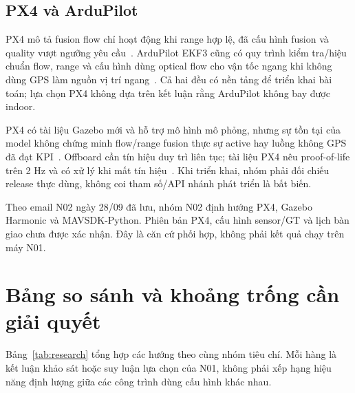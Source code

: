 \documentclass[a4paper,12pt]{article}
\begin{document}
\subsection{PX4 và ArduPilot}
PX4 mô tả fusion flow chỉ hoạt động khi range hợp lệ, đã cấu hình fusion và quality vượt ngưỡng yêu cầu~\cite{source3}. ArduPilot EKF3 cũng có quy trình kiểm tra/hiệu chuẩn flow, range và cấu hình dùng optical flow cho vận tốc ngang khi không dùng GPS làm nguồn vị trí ngang~\cite{source11}. Cả hai đều có nền tảng để triển khai bài toán; lựa chọn PX4 không dựa trên kết luận rằng ArduPilot không bay được indoor.

PX4 có tài liệu Gazebo mới và hỗ trợ mô hình mô phỏng, nhưng sự tồn tại của model không chứng minh flow/range fusion thực sự active hay luồng không GPS đã đạt KPI~\cite{source12}. Offboard cần tín hiệu duy trì liên tục; tài liệu PX4 nêu proof-of-life trên 2 Hz và có xử lý khi mất tín hiệu~\cite{source13}. Khi triển khai, nhóm phải đối chiếu release thực dùng, không coi tham số/API nhánh phát triển là bất biến.

Theo email N02 ngày 28/09 đã lưu, nhóm N02 định hướng PX4, Gazebo Harmonic và MAVSDK-Python. Phiên bản PX4, cấu hình sensor/GT và lịch bàn giao chưa được xác nhận. Đây là căn cứ phối hợp, không phải kết quả chạy trên máy N01.

\section{Bảng so sánh và khoảng trống cần giải quyết}
Bảng~\ref{tab:research} tổng hợp các hướng theo cùng nhóm tiêu chí. Mỗi hàng là kết luận khảo sát hoặc suy luận lựa chọn của N01, không phải xếp hạng hiệu năng định lượng giữa các công trình dùng cấu hình khác nhau.
\end{document}
